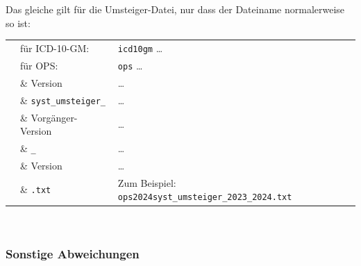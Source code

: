 \newpage %

Das gleiche gilt für die Umsteiger-Datei, nur dass der Dateiname normalerweise so ist:

\begingroup
\renewcommand{\arraystretch}{1.0}
\begin{tabular}{p{\abstandLinksDataInt}p{4cm}l}
& für ICD-10-GM: & \texttt{icd10gm} \ldots\\
& für OPS: & \texttt{ops} \ldots\\
& \& Version & \ldots\\
& \& \texttt{syst\_umsteiger\_} & \ldots\\
& \& Vorgänger-Version & \ldots\\
& \& \texttt{\_} & \ldots\\
& \& Version & \ldots\\
& \& \texttt{.txt} & Zum Beispiel: \texttt{ops2024syst\_umsteiger\_2023\_2024.txt}\\
\end{tabular}
\endgroup \\

\subsubsection{Sonstige Abweichungen}
\label{abweichungen}


